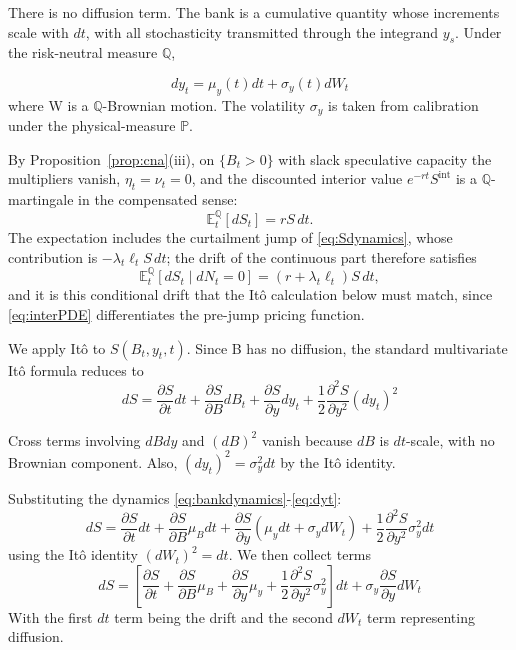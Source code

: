 \documentclass[11pt,letterpaper]{article}
\theoremstyle{plain}
\theoremstyle{definition}
\newcommand{\E}{\mathbb{E}}                  %
\newcommand{\Prob}{\mathbb{P}}               %
\newcommand{\Qmeasure}{\mathbb{Q}}           %
\numberwithin{equation}{section}
\begin{document}
There is no diffusion term. The bank is a cumulative quantity whose increments scale with $dt$, with all stochasticity transmitted through the integrand $y_s$.
Under the risk-neutral measure $\Qmeasure$,

\begin{equation}\label{eq:dyt}
dy_t=\mu_y(t)dt+\sigma_y(t)dW_t
\end{equation}
where W is a $\Qmeasure$-Brownian motion. The volatility $\sigma_y$ is taken from calibration under the physical-measure $\Prob$.

By Proposition~\ref{prop:cna}(iii), on $\{B_t>0\}$ with slack speculative capacity the multipliers vanish, $\eta_t=\nu_t=0$, and the discounted interior value $e^{-rt}S^{\mathrm{int}}$ is a $\Qmeasure$-martingale in the compensated sense:
\begin{equation}\label{eq:noarbitrage}
\E_t^\Qmeasure[dS_t] = rS\,dt.
\end{equation}
The expectation includes the curtailment jump of \eqref{eq:Sdynamics}, whose contribution is $-\lambda_t\ell_t S\,dt$; the drift of the continuous part therefore satisfies
\begin{equation}\label{eq:noarbitrage-cond}
\E_t^\Qmeasure[dS_t \mid dN_t=0] = (r+\lambda_t\ell_t)S\,dt,
\end{equation}
and it is this conditional drift that the It\^o calculation below must match, since \eqref{eq:interPDE} differentiates the pre-jump pricing function.

We apply Itô to $S(B_t, y_t, t)$. Since B has no diffusion, the standard multivariate Itô formula reduces to
\begin{equation}\label{eq:interPDE}
dS=\frac{\partial S}{\partial t}dt+\frac{\partial S}{\partial B}dB_t+\frac{\partial S}{\partial y}dy_t+\frac{1}{2}\frac{\partial^2 S}{\partial y^2}(dy_t)^2
\end{equation}

Cross terms involving $dBdy$ and $(dB)^2$ vanish because $dB$ is $dt$-scale, with no Brownian component. Also, $(dy_t)^2=\sigma_y^2dt$ by the Itô identity.

Substituting the dynamics \ref{eq:bankdynamics}-\ref{eq:dyt}:
\begin{equation}\label{eq:dynpde}
dS=\frac{\partial S}{\partial t}dt+\frac{\partial S}{\partial B}\mu_Bdt+\frac{\partial S}{\partial y}(\mu_y dt+\sigma_y dW_t)+\frac{1}{2}\frac{\partial^2 S}{\partial y^2}\sigma_y^2dt
\end{equation}
using the Itô identity $(dW_t)^2=dt$. We then collect terms
\begin{equation}
dS=[\frac{\partial S}{\partial t}+\frac{\partial S}{\partial B}\mu_B+\frac{\partial S}{\partial y}\mu_y +\frac{1}{2}\frac{\partial^2 S}{\partial y^2}\sigma_y^2]dt + \sigma_y\frac{\partial S}{\partial y}dW_t
\end{equation}
With the first $dt$ term being the drift and the second $dW_t$ term representing diffusion.
\end{document}
